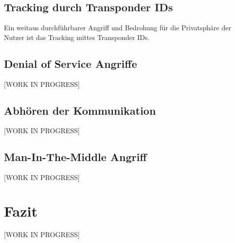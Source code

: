 \documentclass[conference]{IEEEtran}
\begin{document}
\subsection{Tracking durch Transponder IDs}
Ein weitaus durchführbarer Angriff und Bedrohung für die Privatsphäre der Nutzer ist das Tracking mittes Transponder IDs.


\subsection{Denial of Service Angriffe}
[WORK IN PROGRESS]

\subsection{Abhören der Kommunikation}
[WORK IN PROGRESS]

\subsection{Man-In-The-Middle Angriff}
[WORK IN PROGRESS]

\section{Fazit}
[WORK IN PROGRESS]
\end{document}
